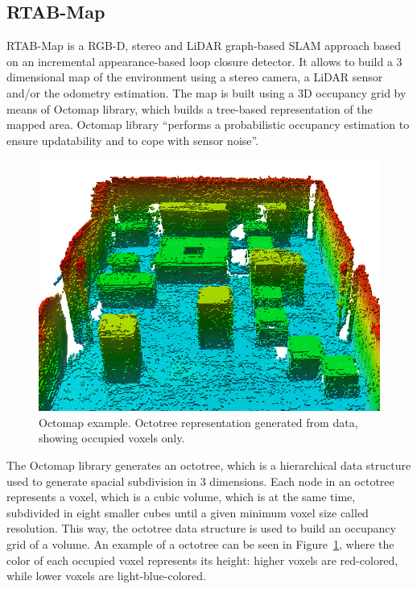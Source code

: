 \subsection{RTAB-Map}
\label{subsec:chapter1:ros:octomap}
\ac{RTAB-Map} is a RGB-D, stereo and LiDAR graph-based \ac{SLAM} approach based on an incremental appearance-based loop closure detector. It allows to build a 3 dimensional map of the environment using a stereo camera, a LiDAR sensor and/or the odometry estimation. The map is built using a 3D occupancy grid by means of Octomap library, which builds a tree-based representation of the mapped area. Octomap library \enquote{performs a probabilistic occupancy estimation to ensure updatability and to cope with sensor noise}\cite{octomap-paper}.\\

\begin{figure}
    \centering
    \includegraphics[width=\textwidth]{Images/fig14-octomap-colored2.png}
    \caption[Octomap example]{Octomap example. Octotree representation generated from data, showing occupied voxels only. \cite{octomap-paper}}
    \label{fig:chapter1:ros:octomap}
\end{figure}


The Octomap library generates an octotree, which is a hierarchical data structure used to generate spacial subdivision in 3 dimensions. Each node in an octotree represents a voxel, which is a cubic volume, which is at the same time, subdivided in eight smaller cubes until a given minimum voxel size called resolution. This way, the octotree data structure is used to build an occupancy grid of a volume. An example of a octotree can be seen in Figure~\ref{fig:chapter1:ros:octomap}, where the color of each occupied voxel represents its height: higher voxels are red-colored, while lower voxels are light-blue-colored.\\

